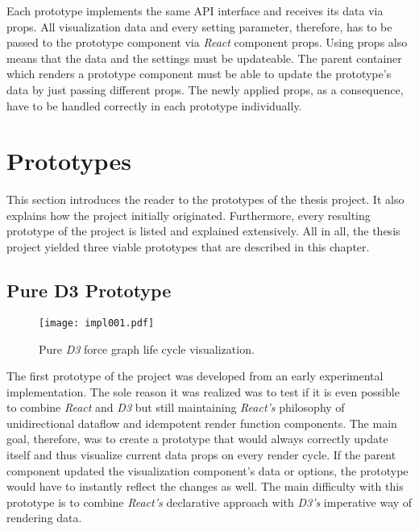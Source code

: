 Each prototype implements the same API interface and receives its data via props. All visualization data and every setting parameter, therefore, has to be passed to the prototype component via \emph{React} component props. Using props also means that the data and the settings must be updateable. The parent container which renders a prototype component must be able to update the prototype's data by just passing different props. The newly applied props, as a consequence, have to be handled correctly in each prototype individually.


\section{Prototypes}

This section introduces the reader to the prototypes of the thesis project. It also explains how the project initially originated. Furthermore, every resulting prototype of the project is listed and explained extensively. All in all, the thesis project yielded three viable prototypes that are described in this chapter. 


\subsection{Pure D3 Prototype}
\label{sec:pureD3prototype}

\begin{figure}
\centering
\texttt{[image: impl001.pdf]}
\caption{Pure \emph{D3} force graph life cycle visualization.}
\label{fig:pureD3Lifecycle}
\end{figure}

The first prototype of the project was developed from an early experimental implementation. The sole reason it was realized was to test if it is even possible to combine \emph{React} and \emph{D3} but still maintaining \emph{React's} philosophy of unidirectional dataflow and idempotent render function components. The main goal, therefore, was to create a prototype that would always correctly update itself and thus visualize current data props on every render cycle. If the parent component updated the visualization component's data or options, the prototype would have to instantly reflect the changes as well. The main difficulty with this prototype is to combine \emph{React's} declarative approach with \emph{D3's} imperative way of rendering data.

